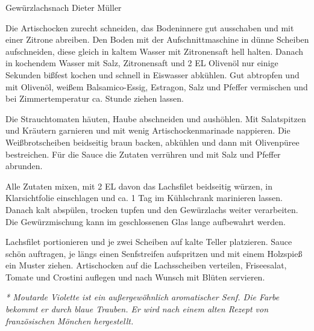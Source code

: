 \documentclass[11pt, a4paper, toc=index, twoside, DIV12]{scrbook}
\begin{document}
%
\begin{recipe}{Gewürzlachs}{nach Dieter Müller}



  
  \steps
  Die Artischocken zurecht schneiden, das Bodeninnere gut ausschaben und mit einer Zitrone
  abreiben.  Den Boden mit der Aufschnittmaschine in dünne Scheiben aufschneiden, diese
  gleich in kaltem Wasser mit Zitronensaft hell halten.  Danach in kochendem Wasser mit
  Salz, Zitronensaft und 2 EL Olivenöl nur einige Sekunden bißfest kochen und schnell in
  Eiswasser abkühlen.  Gut abtropfen und mit Olivenöl, weißem Balsamico-Essig, Estragon,
  Salz und Pfeffer vermischen und bei Zimmertemperatur ca. \halb Stunde ziehen lassen.  
  
  Die Strauchtomaten häuten, Haube abschneiden und aushöhlen. Mit Salatspitzen und
  Kräutern garnieren und mit wenig Artischockenmarinade nappieren. Die Weißbrotscheiben
  beidseitig braun backen, abkühlen und dann mit Olivenpüree bestreichen. Für die Sauce
  die Zutaten verrühren und mit Salz und Pfeffer abrunden.

  Alle Zutaten mixen, mit 2 EL davon das Lachsfilet beidseitig würzen, in Klarsichtfolie
  einschlagen und ca. 1 Tag im Kühlschrank marinieren lassen.  Danach kalt abspülen,
  trocken tupfen und den Gewürzlachs weiter verarbeiten.  Die Gewürzmischung kann im
  geschlossenen Glas lange aufbewahrt werden.

  Lachsfilet portionieren und je zwei Scheiben auf kalte Teller platzieren. Sauce schön
  auftragen, je längs einen Senfstreifen aufspritzen und mit einem Holzspieß ein Muster
  ziehen.  Artischocken auf die Lachsscheiben verteilen, Friseesalat, Tomate und Crostini
  auflegen und nach Wunsch mit Blüten servieren.

  \textit{* Moutarde Violette ist ein außergewöhnlich aromatischer Senf. Die Farbe bekommt er
  durch blaue Trauben. Er wird nach einem alten Rezept von französischen Mönchen
  hergestellt.}
\end{recipe}
\end{document}

